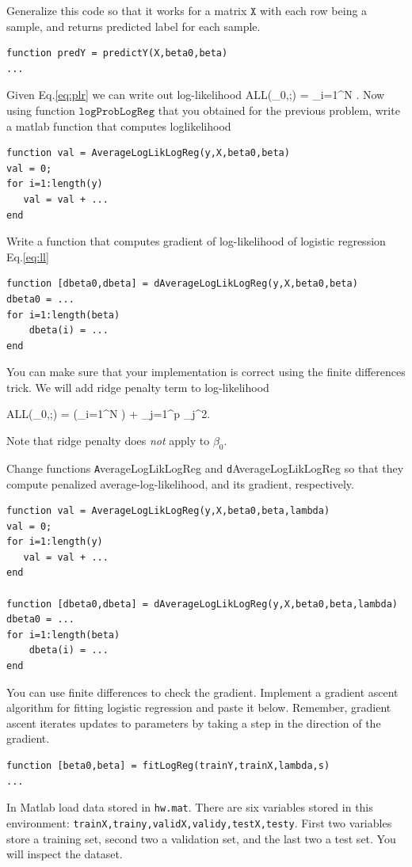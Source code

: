 \documentclass{article}
\begin{document}
Generalize this code so that it works for a matrix $\texttt{X}$ with each row being a sample, and returns predicted label for each sample.
\begin{verbatim}
function predY = predictY(X,beta0,beta)
...
\end{verbatim}

\newproblem{0.5pt}
Given Eq.\eqref{eq:plr} we can write out log-likelihood
\BEQ \label{eq:ll}
\textrm{ALL}(\beta_0,\beta;) = \sum_{i=1}^N \log {}.
\EEQ
Now using function $\texttt{logProbLogReg}$ that you obtained for the previous problem, write a matlab function that computes loglikelihood
\begin{verbatim}
function val = AverageLogLikLogReg(y,X,beta0,beta)
val = 0;
for i=1:length(y)
   val = val + ...
end
\end{verbatim}
\newproblem{0.5pt}
Write a function that computes gradient of log-likelihood of logistic regression Eq.\eqref{eq:ll}
\begin{verbatim}
function [dbeta0,dbeta] = dAverageLogLikLogReg(y,X,beta0,beta)
dbeta0 = ...
for i=1:length(beta)
    dbeta(i) = ...
end
\end{verbatim}
You can make sure that your implementation is correct using the finite differences trick.
\newproblem{0.5pt}
We will add ridge penalty term to log-likelihood

\BEQ \label{eq:pll}
\textrm{ALL}(\beta_0,\beta;) = \left(\sum_{i=1}^N \log {}\right) + \lambda\sum_{j=1}^p \beta_j^2.
\EEQ

Note that ridge penalty does {\em not} apply to $\beta_0$.

Change functions {\texttt AverageLogLikLogReg} and {\texttt dAverageLogLikLogReg} so that they compute penalized average-log-likelihood, and its gradient, respectively.

\begin{verbatim}
function val = AverageLogLikLogReg(y,X,beta0,beta,lambda)
val = 0;
for i=1:length(y)
   val = val + ...
end

function [dbeta0,dbeta] = dAverageLogLikLogReg(y,X,beta0,beta,lambda)
dbeta0 = ...
for i=1:length(beta)
    dbeta(i) = ...
end
\end{verbatim}
You can use finite differences to check the gradient.
\newproblem{2pt}
Implement a gradient ascent algorithm for fitting logistic regression and paste it below.
Remember, gradient ascent iterates updates to parameters by taking a step in the direction of the gradient.  
\begin{verbatim}
function [beta0,beta] = fitLogReg(trainY,trainX,lambda,s)
...
\end{verbatim}
\newproblem{1pt} In Matlab load data stored in \texttt{hw\theHW.mat}. There are six variables stored in this environment:
\texttt{trainX,trainy,validX,validy,testX,testy}. First two variables store a training set, second two a validation set, and the last two a test set.
You will inspect the dataset. 
\end{document}
